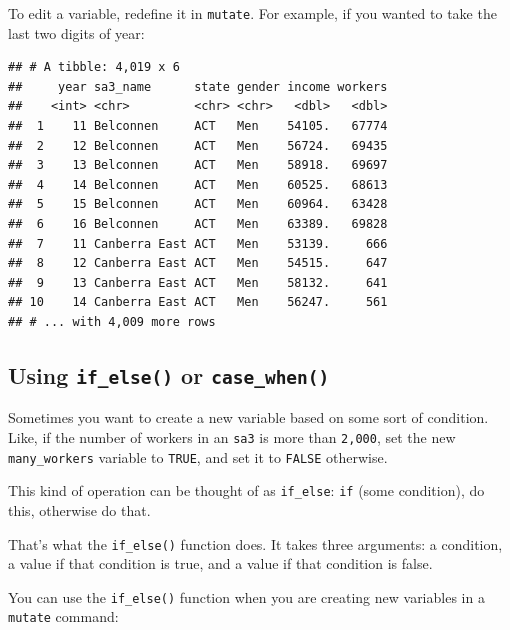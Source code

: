 \documentclass[]{book}
\newenvironment{Shaded}{\begin{snugshade}}{\end{snugshade}}
\newcommand{\DataTypeTok}[1]{\textcolor[rgb]{0.13,0.29,0.53}{#1}}
\newcommand{\DecValTok}[1]{\textcolor[rgb]{0.00,0.00,0.81}{#1}}
\newcommand{\KeywordTok}[1]{\textcolor[rgb]{0.13,0.29,0.53}{\textbf{#1}}}
\newcommand{\NormalTok}[1]{#1}
\newcommand{\OperatorTok}[1]{\textcolor[rgb]{0.81,0.36,0.00}{\textbf{#1}}}
\newcommand{\StringTok}[1]{\textcolor[rgb]{0.31,0.60,0.02}{#1}}
\begin{document}
To edit a variable, redefine it in \texttt{mutate}. For example, if you wanted to take the last two digits of year:

\begin{Shaded}
\end{Shaded}

\begin{verbatim}
## # A tibble: 4,019 x 6
##     year sa3_name      state gender income workers
##    <int> <chr>         <chr> <chr>   <dbl>   <dbl>
##  1    11 Belconnen     ACT   Men    54105.   67774
##  2    12 Belconnen     ACT   Men    56724.   69435
##  3    13 Belconnen     ACT   Men    58918.   69697
##  4    14 Belconnen     ACT   Men    60525.   68613
##  5    15 Belconnen     ACT   Men    60964.   63428
##  6    16 Belconnen     ACT   Men    63389.   69828
##  7    11 Canberra East ACT   Men    53139.     666
##  8    12 Canberra East ACT   Men    54515.     647
##  9    13 Canberra East ACT   Men    58132.     641
## 10    14 Canberra East ACT   Men    56247.     561
## # ... with 4,009 more rows
\end{verbatim}

\hypertarget{using-if_else-or-case_when}{%
\subsection{\texorpdfstring{Using \texttt{if\_else()} or \texttt{case\_when()}}{Using if\_else() or case\_when()}}\label{using-if_else-or-case_when}}

Sometimes you want to create a new variable based on some sort of condition. Like, if the number of workers in an \texttt{sa3} is more than \texttt{2,000}, set the new \texttt{many\_workers} variable to \texttt{TRUE}, and set it to \texttt{FALSE} otherwise.

This kind of operation can be thought of as \texttt{if\_else}: \texttt{if} (some condition), do this, otherwise do that.

That's what the \texttt{if\_else()} function does. It takes three arguments: a condition, a value if that condition is true, and a value if that condition is false.

You can use the \texttt{if\_else()} function when you are creating new variables in a \texttt{mutate} command:
\end{document}
